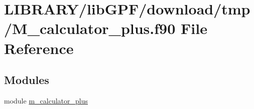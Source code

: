 \hypertarget{M__calculator__plus_8f90}{}\section{L\+I\+B\+R\+A\+R\+Y/lib\+G\+P\+F/download/tmp/\+M\+\_\+calculator\+\_\+plus.f90 File Reference}
\label{M__calculator__plus_8f90}
\subsection*{Modules}
\begin{DoxyCompactItemize}
\item 
module \hyperlink{namespacem__calculator__plus}{m\+\_\+calculator\+\_\+plus}
\end{DoxyCompactItemize}
